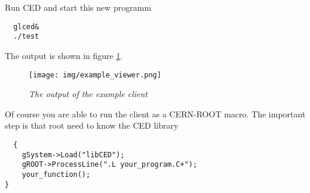 \documentclass[a4paper,10pt]{article}
\begin{document}
Run CED and start this new programm
\begin{verbatim}
  glced& 
  ./test
\end{verbatim}
The output is shown in figure \ref{myviewer_pic}.
\begin{figure}
    \begin{center}
         \texttt{[image: img/example\_viewer.png]}
         \caption{\label{myviewer_pic} \textsl{The output of the example client}}
    \end{center}
\end{figure}


Of course you are able to run the client as a CERN-ROOT macro. 
The important step is that root need to know the CED library

\begin{verbatim}
  {
    gSystem->Load("libCED");
    gROOT->ProcessLine(".L your_program.C+");
    your_function();
}
\end{verbatim}
\end{document}
